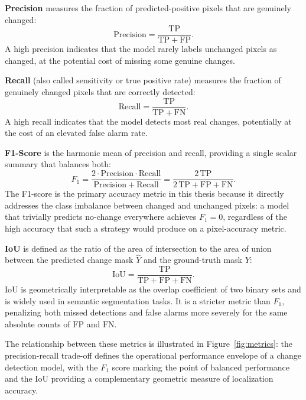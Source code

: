 \noindent\textbf{Precision} measures the fraction of predicted-positive pixels that are genuinely changed:
\begin{equation}
\mathrm{Precision}
    = \frac{\mathrm{TP}}{\mathrm{TP} + \mathrm{FP}}.
\label{eq:precision}
\end{equation}
A high precision indicates that the model rarely labels unchanged pixels as changed, at the potential cost of missing some genuine changes.

\noindent\textbf{Recall} (also called sensitivity or true positive rate) measures the fraction of genuinely changed pixels that are correctly detected:
\begin{equation}
\mathrm{Recall}
    = \frac{\mathrm{TP}}{\mathrm{TP} + \mathrm{FN}}.
\label{eq:recall}
\end{equation}
A high recall indicates that the model detects most real changes, potentially at the cost of an elevated false alarm rate.

\noindent\textbf{F1-Score} is the harmonic mean of precision and recall, providing a single scalar summary that balances both:
\begin{equation}
F_1
    = \frac{2 \cdot \mathrm{Precision} \cdot \mathrm{Recall}}
           {\mathrm{Precision} + \mathrm{Recall}}
    = \frac{2\,\mathrm{TP}}{2\,\mathrm{TP} + \mathrm{FP} + \mathrm{FN}}.
\label{eq:f1}
\end{equation}
The F1-score is the primary accuracy metric in this thesis because it directly addresses the class imbalance between changed and unchanged pixels: a model that trivially predicts no-change everywhere achieves $F_1 = 0$, regardless of the high accuracy that such a strategy would produce on a pixel-accuracy metric.

\noindent\textbf{\ac{IoU}} is defined as the ratio of the area of intersection to the area of union between the predicted change mask $\hat{Y}$ and the ground-truth mask $Y$:
\begin{equation}
\mathrm{IoU}
    = \frac{\mathrm{TP}}{\mathrm{TP} + \mathrm{FP} + \mathrm{FN}}.
\label{eq:iou}
\end{equation}
\ac{IoU} is geometrically interpretable as the overlap coefficient of two binary sets and is widely used in semantic segmentation tasks. It is a stricter metric than $F_1$, penalizing both missed detections and false alarms more severely for the same absolute counts of $\mathrm{FP}$ and $\mathrm{FN}$.

The relationship between these metrics is illustrated in Figure~\ref{fig:metrics}: the precision-recall trade-off defines the operational performance envelope of a change detection model, with the $F_1$ score marking the point of balanced performance and the \ac{IoU} providing a complementary geometric measure of localization accuracy.

